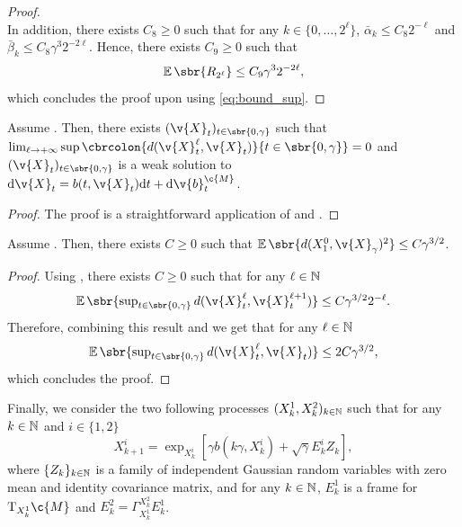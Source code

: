 \begin{proof}{}{}
\begin{equation}
{		}
	\end{equation}
	In addition, there exists $C_8 \geq 0$ such that for any $k \in \{0, \dots, 2^\ell\}$, $\bar{\alpha}_k \leq C_8 2^{-\ell}$ and $\bar{\beta}_k \leq C_8 \gamma^3 2^{-2\ell}$.
	Hence, there exists $C_9 \geq 0$ such that \begin{equation} \E\sbr{R_{2^\ell}} \leq C_9 \gamma^3 2^{-2\ell} , \end{equation} which concludes the proof upon using \eqref{eq:bound_sup}.

\end{proof}
\begin{proposition}
	\label{prop:limit_seq}
	Assume .
	Then, there exists $(\v{X}_t)_{t \in \sbr{0,\gamma}}$ such that $\lim_{\ell \to +\infty} \sup \cbrcolon{d(\v{X}_t^\ell, \v{X}_t)}{t \in \sbr{0, \gamma}} =0$ and $(\v{X}_t)_{t \in \sbr{0,\gamma}}$ is a weak solution to $\mathrm{d} \v{X}_t = b(t, \v{X}_t) \mathrm{d} t + \mathrm{d} \v{b}_t^\c{M}$.
\end{proposition}

\begin{proof}
	The proof is a straightforward application of  and \cite[A.1 (Step 2 and Step 3), A.2]{cheng2022theorymanifold}.
\end{proof}

\begin{proposition}
	\label{prop:borne_one_step}
	Assume .
	Then, there exists $C \geq 0$ such that $\E\sbr{d(X_1^0, \v{X}_\gamma)^2 } \leq C \gamma^{3/2}$.
\end{proposition}

\begin{proof}
	Using , there exists $C \geq 0$ such that for any $\ell \in \mathbb{N}$ \begin{equation} \textstyle{ \E\sbr{\sup_{t \in \sbr{0, \gamma}} d(\v{X}_t^\ell, \v{X}_t^{\ell+1})} \leq C \gamma^{3/2} 2^{-\ell} .
		}
	\end{equation}
	Therefore, combining this result and  we get that for any $\ell \in \mathbb{N}$ \begin{equation} \textstyle{ \E\sbr{\sup_{t \in \sbr{0, \gamma}} d(\v{X}_t^\ell, \v{X}_t)} \leq 2 C \gamma^{3/2} , } \end{equation} which concludes the proof.
\end{proof}

Finally, we consider the two following processes $(X_k^1, X_k^2)_{k \in \mathbb{N}}$ such that for any $k \in \mathbb{N}$ and $i \in \{1, 2\}$ \begin{equation} X_{k+1}^i = \exp_{X_k^i}[\gamma b(k \gamma, X_k^i) + \sqrt{\gamma} E_k^i Z_k ] , \end{equation} where $\{Z_k\}_{k \in \mathbb{N}}$ is a family of independent Gaussian random variables with zero mean and identity covariance matrix, and for any $k \in \mathbb{N}$, $E_k^1$ is a frame for $\mathrm{T}_{X_k^1} \c{M}$ and $E_k^2 = \Gamma_{X_k^1}^{X_k^2} E_k^1$.

